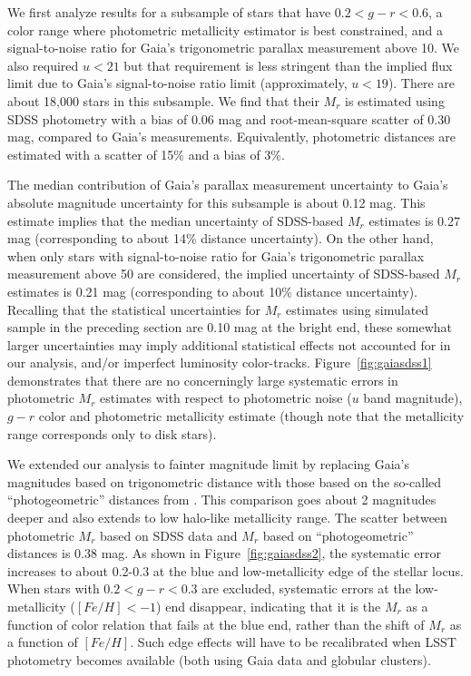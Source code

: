 We first analyze results for a subsample of stars that have $0.2 < g − r < 0.6$, a color range where photometric metallicity estimator is best constrained,
and a signal-to-noise ratio for Gaia's trigonometric
parallax measurement above 10.  We also required $u<21$ but that requirement is less stringent than the implied flux limit due to
Gaia's signal-to-noise ratio limit (approximately, $u<19$). There are about 18,000 stars in this subsample.
We find that their $M_r$ is estimated using SDSS photometry with a bias of 0.06 mag and root-mean-square scatter of 0.30 mag, compared
to Gaia's measurements. Equivalently, photometric distances  are estimated with a scatter of 15\% and a bias of 3\%.

The median contribution of Gaia's parallax measurement uncertainty to Gaia's absolute
magnitude uncertainty for this subsample is about 0.12 mag. This estimate implies that the median uncertainty of SDSS-based $M_r$
estimates is 0.27 mag (corresponding to about 14\% distance uncertainty). On the other hand, when only stars with signal-to-noise
ratio for Gaia's trigonometric parallax measurement above 50 are considered, the implied uncertainty of SDSS-based $M_r$
estimates is 0.21 mag (corresponding to about 10\% distance uncertainty).  Recalling that the statistical uncertainties for $M_r$
estimates using simulated sample in the preceding section are 0.10 mag at the bright end, these somewhat larger uncertainties may
imply additional statistical effects not accounted for in our analysis, and/or imperfect luminosity color-tracks.
Figure~\ref{fig:gaiasdss1} demonstrates that there are no concerningly large systematic errors in photometric $M_r$ estimates with
respect to photometric noise ($u$ band magnitude), $g-r$ color and photometric metallicity estimate (though note that the metallicity
range corresponds only to disk stars).

We extended our analysis to fainter magnitude limit by replacing Gaia's magnitudes based on trigonometric distance with those based on
the so-called ``photogeometric'' distances from \cite{bailer-jones_estimating_2021}. This comparison goes about 2
magnitudes deeper and also extends to low halo-like metallicity range. The scatter between photometric $M_r$ based on SDSS data and
$M_r$ based on ``photogeometric'' distances is 0.38 mag. As shown in Figure~\ref{fig:gaiasdss2}, the systematic error
increases to about 0.2-0.3 at the blue and low-metallicity edge of the stellar locus. When stars with $0.2 < g-r < 0.3$ are excluded,
systematic errors at the low-metallicity ($[Fe/H]<-1$) end disappear, indicating that it is the $M_r$ as a function of color relation that fails at the blue end,
rather than the shift of $M_r$ as a function of $[Fe/H]$. Such edge effects will have to be recalibrated when LSST photometry becomes available
(both using Gaia data and globular clusters). 



